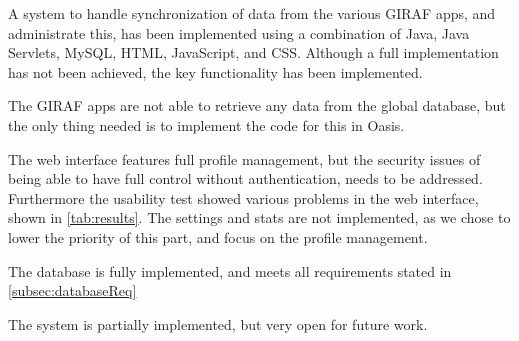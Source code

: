 A system to handle synchronization of data from the various GIRAF apps, and administrate this, has been implemented using a combination of Java, Java Servlets, MySQL, HTML, JavaScript, and CSS.
Although a full implementation has not been achieved, the key functionality has been implemented. 

The GIRAF apps are not able to retrieve any data from the global database, but the only thing needed is to implement the code for this in Oasis. 

The web interface features full profile management, but the security issues of being able to have full control without authentication, needs to be addressed.
 Furthermore the usability test showed various problems in the web interface, shown in \autoref{tab:results}. The settings and stats are not implemented, as we chose to lower the priority of this part, and focus on the profile management.
 
The database is fully implemented, and meets all requirements stated in \autoref{subsec:databaseReq}

The system is partially implemented, but very open for future work.